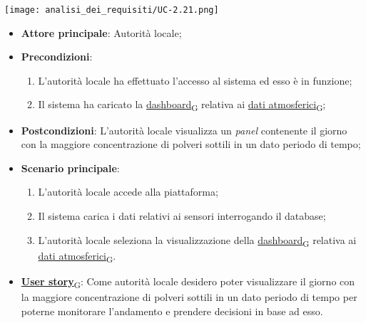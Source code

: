 \begin{center}
	\texttt{[image: analisi\_dei\_requisiti/UC-2.21.png]}
\end{center}

\begin{itemize}
	\item \textbf{Attore principale}: Autorità locale;
	\item \textbf{Precondizioni}:
	      \begin{enumerate}
		      \item L'autorità locale ha effettuato l'accesso al sistema ed esso è in funzione;
		      \item Il sistema ha caricato la \href{https://7last.github.io/docs/rtb/documentazione-interna/glossario\#dashboard}{dashboard\textsubscript{G}} relativa ai \href{https://7last.github.io/docs/rtb/documentazione-interna/glossario\#dati-atmosferici}{dati atmosferici\textsubscript{G}};
	      \end{enumerate}
	\item \textbf{Postcondizioni}: L'autorità locale visualizza un \textit{panel} contenente il giorno con la maggiore concentrazione di polveri sottili
	      in un dato periodo di tempo;
	\item \textbf{Scenario principale}:
	      \begin{enumerate}
		      \item L'autorità locale accede alla piattaforma;
		      \item Il sistema carica i dati relativi ai sensori interrogando il database;
		      \item L'autorità locale seleziona la visualizzazione della \href{https://7last.github.io/docs/rtb/documentazione-interna/glossario\#dashboard}{dashboard\textsubscript{G}} relativa ai \href{https://7last.github.io/docs/rtb/documentazione-interna/glossario\#dati-atmosferici}{dati atmosferici\textsubscript{G}}.
	      \end{enumerate}
	\item \href{https://7last.github.io/docs/rtb/documentazione-interna/glossario\#user-story}{\textbf{User story}\textsubscript{G}}: Come autorità locale desidero poter visualizzare il giorno con la maggiore concentrazione di polveri sottili
	      in un dato periodo di tempo per poterne monitorare l'andamento e prendere decisioni in base ad esso.
\end{itemize}

